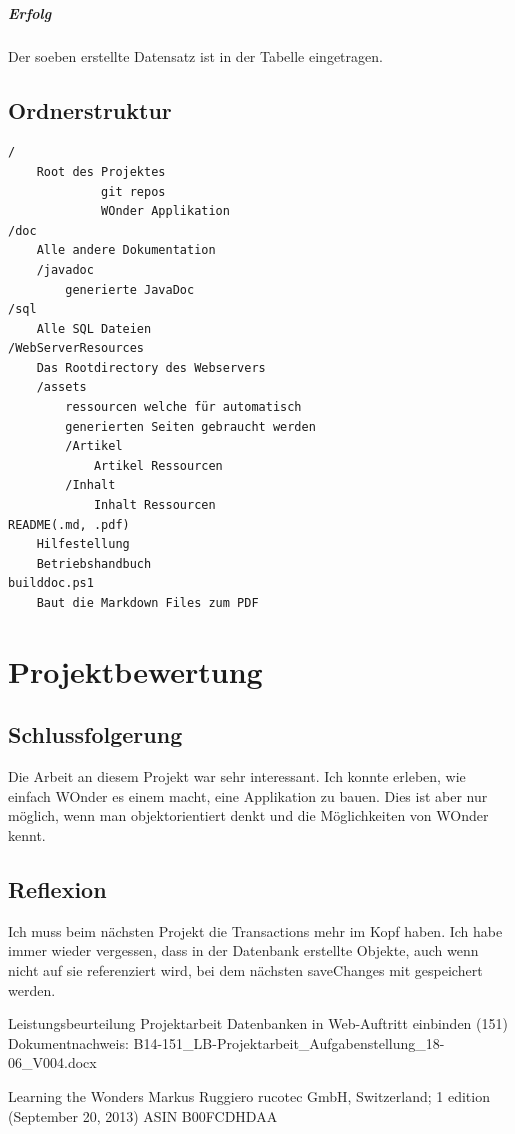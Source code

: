 \documentclass[a4paper, 11pt]{article}
\begin{document}
\subparagraph{Erfolg}

Der soeben erstellte Datensatz ist in der Tabelle eingetragen.


\clearpage
\subsection{Ordnerstruktur}

\begin{verbatim}
/
    Root des Projektes
             git repos
             WOnder Applikation
/doc
    Alle andere Dokumentation
    /javadoc
        generierte JavaDoc
/sql
    Alle SQL Dateien
/WebServerResources
    Das Rootdirectory des Webservers
    /assets
        ressourcen welche für automatisch
        generierten Seiten gebraucht werden
        /Artikel
            Artikel Ressourcen
        /Inhalt
            Inhalt Ressourcen
README(.md, .pdf)
	Hilfestellung
	Betriebshandbuch
builddoc.ps1
	Baut die Markdown Files zum PDF
\end{verbatim}

\section{Projektbewertung}

\subsection{Schlussfolgerung}

Die Arbeit an diesem Projekt war sehr interessant. Ich konnte erleben, wie einfach WOnder es einem macht, eine Applikation zu bauen. Dies ist aber nur möglich, wenn man objektorientiert denkt und die Möglichkeiten von WOnder kennt.

\subsection{Reflexion}

Ich muss beim nächsten Projekt die Transactions mehr im Kopf haben. Ich habe immer wieder vergessen, dass in der Datenbank erstellte Objekte, auch wenn nicht auf sie referenziert wird, bei dem nächsten saveChanges mit gespeichert werden.


\listoffigures

\begin{thebibliography}{9}
Leistungsbeurteilung Projektarbeit
Datenbanken in Web-Auftritt einbinden (151)
Dokumentnachweis: B14-151\_LB-Projektarbeit\_Aufgabenstellung\_18-06\_V004.docx

Learning the Wonders
Markus Ruggiero
rucotec GmbH, Switzerland; 1 edition (September 20, 2013)
ASIN B00FCDHDAA

\end{thebibliography}
\end{document}
